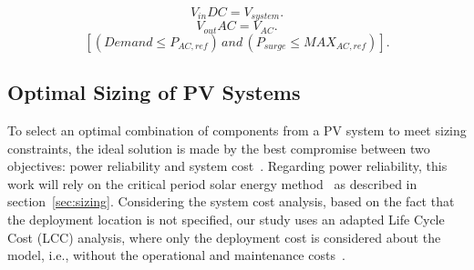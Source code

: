\documentclass[10pt,conference]{IEEEtran}
\begin{document}
%
\begin{equation}
\label{eq:vindc} 
\scriptstyle V_{in}DC = \scriptstyle V_{system}.
\end{equation}
%
\begin{equation}
\label{eq:voutac} 
\scriptstyle V_{out}AC = \scriptstyle V_{AC}.
\end{equation}
%
\begin{equation}
\label{eq:invcheck} 
\left[ (\scriptstyle Demand \leq \scriptstyle P_{AC,ref}) \, \scriptstyle and \, \scriptstyle (P_{surge} \leq MAX_{AC,ref}) \right].
\end{equation}
\subsection{Optimal Sizing of PV Systems}
%
To select an optimal combination of components from a PV system to meet sizing constraints, 
the ideal solution is made by the best compromise between two objectives: power reliability and system cost~\cite{Alsadi2018}. 
Regarding power reliability, this work will rely on the critical period solar energy method~\cite{Pinho} as described in section~\ref{sec:sizing}. 
Considering the system cost analysis, based on the fact that the deployment location is not specified, our study uses an adapted Life Cycle Cost (LCC) analysis, where only the deployment cost is considered about the model, i.e., without the operational and maintenance costs~\cite{Alsadi2018}.
\end{document}
